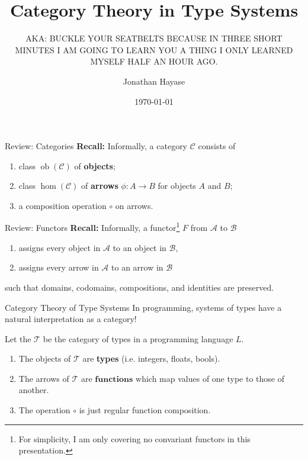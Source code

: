 \documentclass[10pt]{beamer}
\title{Category Theory in Type Systems}
\subtitle{AKA: BUCKLE YOUR SEATBELTS BECAUSE IN THREE SHORT MINUTES I AM GOING TO LEARN YOU A THING I ONLY LEARNED MYSELF HALF AN HOUR AGO.}
\date{\today}
\author{Jonathan Hayase}
\institute{Math 171 -- Abstract Algebra -- Spring 2018}
\DeclareMathOperator{\ob}{ob}
\begin{document}
\maketitle

\begin{frame}{Review: Categories}
  \textbf{Recall:}
  Informally, a category \(\mathcal{C}\) consists of
  \begin{enumerate}
  \item class \(\ob(\mathcal C)\) of \textbf{objects};
  \item class \(\hom(\mathcal C)\) of \textbf{arrows} \(\phi: A \to B\) for objects \(A\) and \(B\);
  \item a composition operation \(\circ\) on arrows.
  \end{enumerate}
\end{frame}

\begin{frame}{Review: Functors}
  \textbf{Recall:}
  Informally, a functor\footnote{For simplicity, I am only covering no convariant functors in this presentation.} \(F\) from \(\mathcal A\) to \(\mathcal B\)
  \begin{enumerate}
  \item assigns every object in \(\mathcal A\) to an object in \(\mathcal B\),
  \item assigns every arrow in \(\mathcal A\) to an arrow in \(\mathcal B\)
  \end{enumerate}
  such that domains, codomains, compositions, and identities are preserved.
\end{frame}

\begin{frame}{Category Theory of Type Systems}
  In programming, systems of types have a natural interpretation as a category!

  Let the \(\mathcal{T}\) be the category of types in a programming language \(L\).
  \begin{enumerate}
  \item The objects of \(\mathcal T\) are \textbf{types} (i.e. integers, floats, bools).
  \item The arrows of \(\mathcal T\) are \(\mathbf{functions}\) which map values of one type to those of another.
  \item The operation \(\circ\) is just regular function composition.
  \end{enumerate}
\end{frame}
\end{document}
